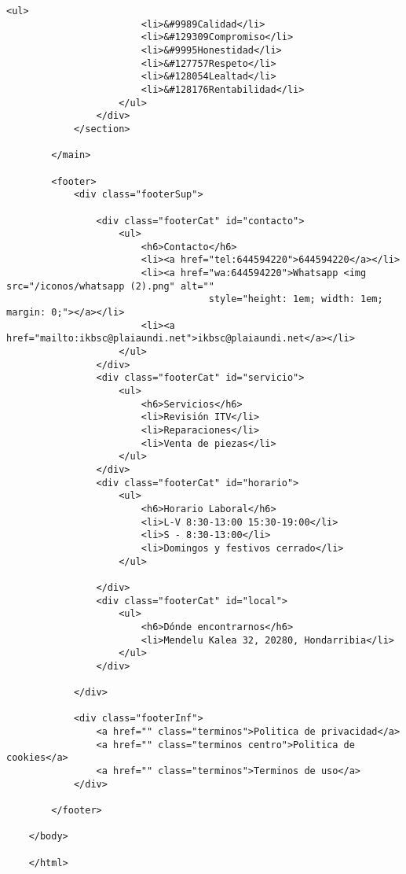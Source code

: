 \begin{lstlisting}[caption=mecanicos.html (LMSI)]
                    <ul>
                        <li>&#9989Calidad</li>
                        <li>&#129309Compromiso</li>
                        <li>&#9995Honestidad</li>
                        <li>&#127757Respeto</li>
                        <li>&#128054Lealtad</li>
                        <li>&#128176Rentabilidad</li>
                    </ul>
                </div>
            </section>
    
        </main>
    
        <footer>
            <div class="footerSup">
    
                <div class="footerCat" id="contacto">
                    <ul>
                        <h6>Contacto</h6>
                        <li><a href="tel:644594220">644594220</a></li>
                        <li><a href="wa:644594220">Whatsapp <img src="/iconos/whatsapp (2).png" alt=""
                                    style="height: 1em; width: 1em; margin: 0;"></a></li>
                        <li><a href="mailto:ikbsc@plaiaundi.net">ikbsc@plaiaundi.net</a></li>
                    </ul>
                </div>
                <div class="footerCat" id="servicio">
                    <ul>
                        <h6>Servicios</h6>
                        <li>Revisión ITV</li>
                        <li>Reparaciones</li>
                        <li>Venta de piezas</li>
                    </ul>
                </div>
                <div class="footerCat" id="horario">
                    <ul>
                        <h6>Horario Laboral</h6>
                        <li>L-V 8:30-13:00 15:30-19:00</li>
                        <li>S - 8:30-13:00</li>
                        <li>Domingos y festivos cerrado</li>
                    </ul>
    
                </div>
                <div class="footerCat" id="local">
                    <ul>
                        <h6>Dónde encontrarnos</h6>
                        <li>Mendelu Kalea 32, 20280, Hondarribia</li>
                    </ul>
                </div>
    
            </div>
    
            <div class="footerInf">
                <a href="" class="terminos">Politica de privacidad</a>
                <a href="" class="terminos centro">Politica de cookies</a>
                <a href="" class="terminos">Terminos de uso</a>
            </div>
    
        </footer>
    
    </body>
    
    </html>
\end{lstlisting}
